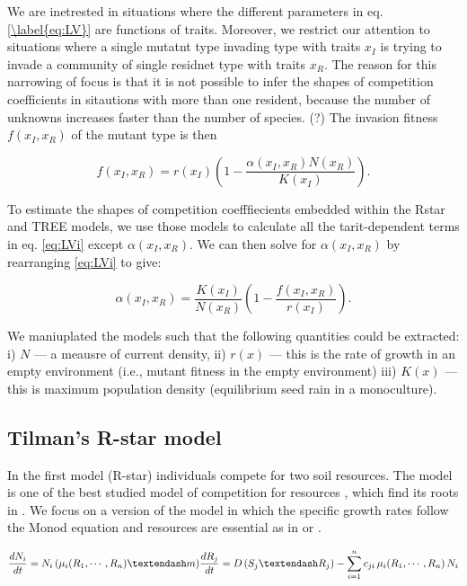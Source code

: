 \documentclass[a4paper,11pt]{article}
\begin{document}
We are inetrested in situations where the different parameters in eq.
\ref{\label{eq:LV}} are functions  of traits. Moreover, we restrict our
attention to situations where a single mutatnt type invading type with traits
$x_I$ is trying to invade a community of single residnet type with traits
$x_R$. The reason for this narrowing of focus is that it is not possible to
infer the shapes of competition coefficients in  sitautions with more than one
resident, because the number of unknowns increases faster than the number of
species. (?)  The invasion fitness $f(x_I, x_R)$ of the mutant type is then

\begin{equation}
  \label{eq:LVi}
   f(x_I, x_R) =
    r(x_I)\left(1 - \frac{\alpha(x_I, x_R) N(x_R)}{K(x_I)}\right).
\end{equation}

To estimate the shapes of competition coefffiecients
embedded within the Rstar and TREE models, we use those models to calculate all
the tarit-dependent terms in eq. \ref{eq:LVi} except $\alpha(x_I, x_R)$. We can
then solve for $\alpha(x_I, x_R)$ by rearranging  \ref{eq:LVi} to give:

\begin{equation}
  \label{eq:alpha}
 \alpha(x_I, x_R) = \frac{K(x_I)}{N(x_R)}
  \left(1 - \frac{f(x_I, x_R)}{r(x_I)}\right).
\end{equation}

We maniuplated the models
such that the following quantities
could be extracted: i) $N$ --- a meausre of current density, ii) $r(x)$ ---
this is the rate of growth in an empty environment (i.e., mutant fitness
in the empty environment) iii) $K(x)$ --- this is maximum population
density (equilibrium seed rain in a monoculture).


\subsection{Tilman's R-star model}

In the first model (R-star) individuals compete for two soil
resources. The model is one of the best studied model of competition
for resources \citep{Tilman-1982}, which find its roots in \citet{Leon-1975}. We focus on a version of the
model in which the specific growth rates follow the Monod
equation and resources are essential as in \citet{Tilman-1977} or \citet{Huisman-1999}.

\begin{equation}
\label{eq:R1}
\frac{dN_i}{dt} = N_i \, (\mu_i(R_1, \cdots,  R_n) – m) \\
\frac{dR_j}{dt} = D \, (S_j – R_j) - \sum_{i=1}^{n}{c_{ji} \,
  \mu_i(R_1, \cdots,  R_n) \, N_i}
\end{equation}
\end{document}
